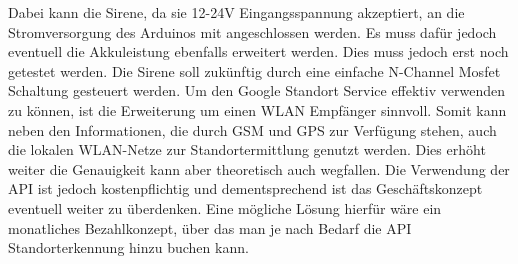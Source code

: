Dabei kann die Sirene, da sie 12-24V Eingangsspannung akzeptiert, an die Stromversorgung des Arduinos mit angeschlossen werden. Es muss dafür jedoch eventuell die Akkuleistung ebenfalls erweitert werden. Dies muss jedoch erst noch getestet werden. 
Die Sirene soll zukünftig durch eine einfache N-Channel Mosfet Schaltung gesteuert werden.
Um den Google Standort Service effektiv verwenden zu können, ist die Erweiterung um einen WLAN Empfänger sinnvoll. Somit kann neben den Informationen, die durch GSM und GPS zur Verfügung stehen, auch die lokalen WLAN-Netze zur Standortermittlung genutzt werden. Dies erhöht weiter die Genauigkeit kann aber theoretisch auch wegfallen. Die Verwendung der API ist jedoch kostenpflichtig und dementsprechend ist das Geschäftskonzept eventuell weiter zu überdenken. Eine mögliche Lösung hierfür wäre ein monatliches Bezahlkonzept, über das man je nach Bedarf die API Standorterkennung hinzu buchen kann.




